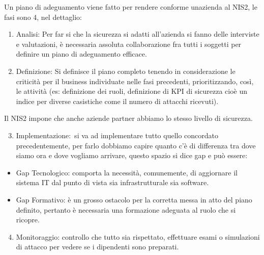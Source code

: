 \documentclass[
]{article}
\providecommand{\tightlist}{%
  \setlength{\itemsep}{0pt}\setlength{\parskip}{0pt}}
\begin{document}
{}

{}

{Un piano di adeguamento viene fatto per rendere conforme
un\textquotesingle azienda al NIS2, le fasi sono 4, nel dettaglio:}

\begin{enumerate}
\tightlist
\item
  {Analisi}{: Per far si che la sicurezza si adatti all'azienda si fanno
  delle }{interviste e valutazioni}{, è necessaria assoluta
  collaborazione fra tutti i soggetti per definire un piano di
  adeguamento efficace.}
\end{enumerate}

{}

\begin{enumerate}
\setcounter{enumi}{1}
\tightlist
\item
  {Definizione}{: }{Si definisce il piano completo tenendo in
  considerazione le criticità per il business individuate nelle fasi
  precedenti}{, prioritizzando, così, le attività (es: definizione dei
  ruoli, definizione di KPI di sicurezza cioè un indice per diverse
  casistiche come il numero di attacchi ricevuti).}
\end{enumerate}

{Il NIS2 impone che anche aziende partner abbiamo lo stesso livello di
sicurezza. }

{}

\begin{enumerate}
\setcounter{enumi}{2}
\tightlist
\item
  {Implementazione:}{~si va ad }{implementare tutto quello concordato
  precedentemente}{, per farlo dobbiamo capire quanto c'è di differenza
  tra dove siamo ora e dove vogliamo arrivare, questo spazio si dice gap
  e può essere:}
\end{enumerate}

\begin{itemize}
\tightlist
\item
  {Gap Tecnologico}{: comporta la necessità, comunemente, di aggiornare
  il sistema IT dal punto di vista sia infrastrutturale sia software.}
\item
  {Gap Formativo}{: è un grosso ostacolo per la corretta messa in atto
  del piano definito, pertanto è necessaria una formazione adeguata al
  ruolo che si ricopre.}
\end{itemize}

{}

\begin{enumerate}
\setcounter{enumi}{3}
\tightlist
\item
  {Monitoraggio}{: }{controllo che tutto sia rispettato}{, effettuare
  esami o simulazioni di attacco per vedere se i dipendenti sono
  preparati.}
\end{enumerate}
\end{document}
